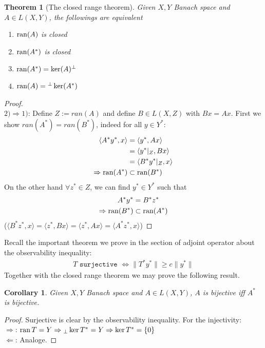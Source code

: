 \documentclass[a4paper,11pt,fleqn]{book}
\newtheorem{theorem}{Theorem}[section]
\newtheorem{corollary}{Corollary}[theorem]
\theoremstyle{definition}
\theoremstyle{remark}
\begin{document}
\begin{theorem}[The closed range theorem]
	Given $X, Y$ Banach space and $A \in L(X,Y)$, the followings are equivalent
	\begin{enumerate}
		\item $\operatorname{ran}(A)$ is closed
		\item $\operatorname{ran}(A^*)$ is closed
		\item $\operatorname{ran}(A^*) = \ker(A)^\perp$
		\item $\operatorname{ran}(A) = {}^\perp\ker(A^*)$ 
	\end{enumerate}
\end{theorem}
\begin{proof}\quad\\
$2)\Rightarrow 1)$: Define $Z:= ran(A)$ and define $B \in L(X,Z)$ with $Bx = Ax$. First we show $ran(A^*) = ran(B^*)$, indeed for all $y \in Y^*:$
\begin{align*}
	\langle A^*y^*, x\rangle &= \langle y^*, Ax\rangle\\
	&= \langle y^*|_Z, Bx\rangle\\
	&= \langle B^* y^*|_Z, x \rangle \\
	\Rightarrow \operatorname{ran}(A^*) &\subset \operatorname{ran}(B^*)
\end{align*}
On the other hand $\forall z^* \in Z$, we can find $y^* \in Y^*$ such that 
\begin{align*}
	A^* y^* &= B^* z^*\\
	\Rightarrow \operatorname{ran}(B^*) &\subset \operatorname{ran}(A^*)
\end{align*}
($\langle B^* z^*, x\rangle = \langle z^*, Bx\rangle = \langle z^*, Ax\rangle = \langle A^* z^*, x\rangle$)
\end{proof}

Recall the important theorem we prove in the section of adjoint operator about the observability inequality:
\begin{align*}
	T\texttt{ surjective } \Leftrightarrow \|T^* y^*\| \ge c \|y^*\|
\end{align*}
Together with the closed range theorem we may prove the following result. 

\begin{corollary}
	Given $X, Y$ Banach space and $A \in L(X, Y)$, $A$ is bijective iff $A^*$ is bijective.
\end{corollary}
\begin{proof}
Surjective is clear by the observability inequality. For the injectivity:\\
$\Rightarrow$: $\operatorname{ran} T = Y \Rightarrow {}_\perp \ker T^* = Y \Rightarrow \ker T^* = \{0 \}$ \\
$\Leftarrow$: Analoge.  
\end{proof}
\end{document}
